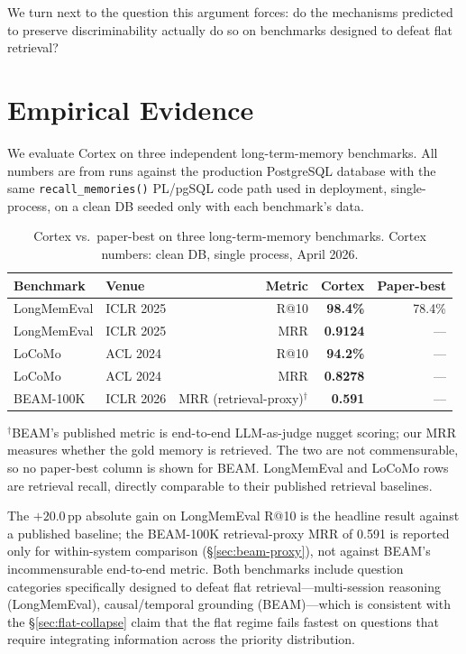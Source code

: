 \documentclass[11pt]{article}
\begin{document}
We turn next to the question this argument forces: do the
mechanisms predicted to preserve discriminability actually do so on
benchmarks designed to defeat flat retrieval?

\section{Empirical Evidence}
\label{sec:empirical}

We evaluate Cortex on three independent long-term-memory benchmarks.
All numbers are from runs against the production PostgreSQL database
with the same \texttt{recall\_memories()} PL/pgSQL code path used in
deployment, single-process, on a clean DB seeded only with each
benchmark's data.

\begin{table}[t]
\centering
\caption{Cortex vs.\ paper-best on three long-term-memory benchmarks.
Cortex numbers: clean DB, single process, April 2026.}
\label{tab:benchmarks}
\begin{tabular}{llrrr}
\toprule
Benchmark & Venue & Metric & Cortex & Paper-best \\
\midrule
LongMemEval & ICLR 2025 & R@10    & \textbf{98.4\%} & 78.4\% \\
LongMemEval & ICLR 2025 & MRR     & \textbf{0.9124} & ---    \\
LoCoMo      & ACL 2024  & R@10    & \textbf{94.2\%} & ---    \\
LoCoMo      & ACL 2024  & MRR     & \textbf{0.8278} & ---    \\
BEAM-100K   & ICLR 2026 & MRR (retrieval-proxy)$^\dagger$ & \textbf{0.591}  & ---    \\
\bottomrule
\end{tabular}

\vspace{2pt}
{\footnotesize $^\dagger$BEAM's published metric is end-to-end
LLM-as-judge nugget scoring; our MRR measures whether the gold
memory is retrieved.  The two are not commensurable, so no
paper-best column is shown for BEAM.  LongMemEval and LoCoMo rows
are retrieval recall, directly comparable to their published
retrieval baselines.}
\end{table}

The $+20.0$\,pp absolute gain on LongMemEval R@10 is the headline
result against a published baseline; the BEAM-100K retrieval-proxy
MRR of 0.591 is reported only for within-system comparison
(\S\ref{sec:beam-proxy}), not against BEAM's incommensurable
end-to-end metric.  Both benchmarks include question categories
specifically designed to
defeat flat retrieval---multi-session reasoning (LongMemEval),
causal/temporal grounding (BEAM)---which is consistent with the
\S\ref{sec:flat-collapse} claim that the flat regime fails fastest
on questions that require integrating information across the
priority distribution.
\end{document}
